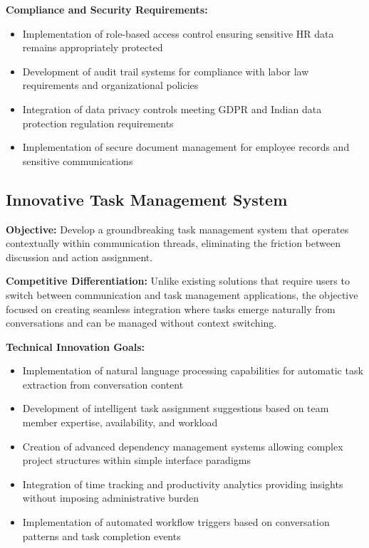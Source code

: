 \textbf{Compliance and Security Requirements:}
\begin{itemize}
    \item Implementation of role-based access control ensuring sensitive HR data remains appropriately protected
    \item Development of audit trail systems for compliance with labor law requirements and organizational policies
    \item Integration of data privacy controls meeting GDPR and Indian data protection regulation requirements
    \item Implementation of secure document management for employee records and sensitive communications
\end{itemize}

\subsection{Innovative Task Management System}

\textbf{Objective:} Develop a groundbreaking task management system that operates contextually within communication threads, eliminating the friction between discussion and action assignment.

\textbf{Competitive Differentiation:} Unlike existing solutions that require users to switch between communication and task management applications, the objective focused on creating seamless integration where tasks emerge naturally from conversations and can be managed without context switching.

\textbf{Technical Innovation Goals:}
\begin{itemize}
    \item Implementation of natural language processing capabilities for automatic task extraction from conversation content
    \item Development of intelligent task assignment suggestions based on team member expertise, availability, and workload
    \item Creation of advanced dependency management systems allowing complex project structures within simple interface paradigms
    \item Integration of time tracking and productivity analytics providing insights without imposing administrative burden
    \item Implementation of automated workflow triggers based on conversation patterns and task completion events
\end{itemize}

